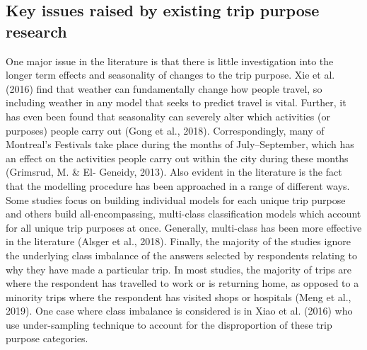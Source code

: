 \subsection{Key issues raised by existing trip purpose research}
One major issue in the literature is that there is little investigation into the longer term effects and seasonality of changes to the trip purpose. Xie et al. (2016) find that weather can fundamentally change how people travel, so including weather in any model that seeks to predict travel is vital. Further, it has even been found that seasonality can severely alter which activities (or purposes) people carry out (Gong et al., 2018). Correspondingly, many of Montreal’s Festivals take place during the months of July–September, which has an effect on the activities people carry out within the city during these months (Grimsrud, M. \& El- Geneidy, 2013).
Also evident in the literature is the fact that the modelling procedure has been approached in a range of different ways. Some studies focus on building individual models for each unique trip purpose and others build all-encompassing, multi-class classification models which account for all unique trip purposes at once. Generally, multi-class has been more effective in the literature (Alsger et al., 2018).
Finally, the majority of the studies ignore the underlying class imbalance of the answers selected by respondents relating to why they have made a particular trip. In most studies, the majority of trips are where the respondent has travelled to work or is returning home, as opposed to a minority trips where the respondent has visited shops or hospitals (Meng et al., 2019). One case where class imbalance is considered is in Xiao et al. (2016) who use under-sampling technique to account for the disproportion of these trip purpose categories.

